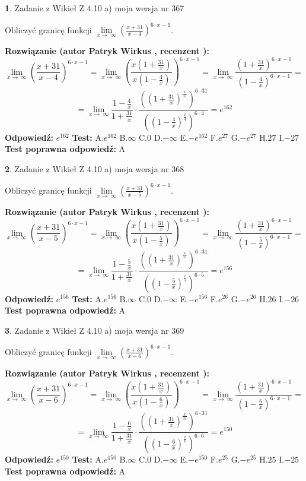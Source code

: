 \documentclass[12pt, a4paper]{article}
\theoremstyle{definition} %
\newtheorem{zad}{}
\newcommand{\zadStart}[1]{\begin{zad}#1\newline}
\newcommand{\zadStop}{\end{zad}}
\newcommand{\rozwStart}[2]{\noindent \textbf{Rozwiązanie (autor #1 , recenzent #2): }\newline}
\newcommand{\rozwStop}{\newline}
\newcommand{\odpStart}{\noindent \textbf{Odpowiedź:}\newline}
\newcommand{\odpStop}{\newline}
\newcommand{\testStart}{\noindent \textbf{Test:}\newline}
\newcommand{\testStop}{\newline}
\newcommand{\kluczStart}{\noindent \textbf{Test poprawna odpowiedź:}\newline}
\newcommand{\kluczStop}{\newline}
\begin{document}
\zadStart{Zadanie z Wikieł Z 4.10 a) moja wersja nr 367}

Obliczyć granicę funkcji  $\lim\limits_{x\to\ \infty}(\frac{x+31}{x-4})^{6\cdot x-1}$.
\zadStop
\rozwStart{Patryk Wirkus}{}
$$\lim\limits_{x\to\ \infty}(\frac{x+31}{x-4})^{6\cdot x-1} = \lim\limits_{x\to\ \infty}(\frac{x(1+\frac{31}{x})}{x(1-\frac{4}{x})})^{6\cdot x-1}=\lim\limits_{x\to\ \infty}\frac{(1+\frac{31}{x})^{6\cdot x-1}}{(1-\frac{4}{x})^{6\cdot x-1}}=$$
$$=\lim\limits_{x\to\ \infty}\frac{1-\frac{4}{x}}{1+\frac{31}{x}}\cdot\frac{((1+\frac{31}{x})^{\frac{x}{31}})^{6\cdot31}}{((1-\frac{4}{x})^{\frac{x}{4}})^{6\cdot4}}=e^{162}$$
\rozwStop
\odpStart
$e^{162}$
\odpStop
\testStart
A.$e^{162}$ B.$\infty$ C.$0$ D.$-\infty$ E.$-e^{162}$
F.$e^{27}$ G.$-e^{27}$
H.$27$
I.$-27$
\testStop
\kluczStart
A
\kluczStop



\zadStart{Zadanie z Wikieł Z 4.10 a) moja wersja nr 368}

Obliczyć granicę funkcji  $\lim\limits_{x\to\ \infty}(\frac{x+31}{x-5})^{6\cdot x-1}$.
\zadStop
\rozwStart{Patryk Wirkus}{}
$$\lim\limits_{x\to\ \infty}(\frac{x+31}{x-5})^{6\cdot x-1} = \lim\limits_{x\to\ \infty}(\frac{x(1+\frac{31}{x})}{x(1-\frac{5}{x})})^{6\cdot x-1}=\lim\limits_{x\to\ \infty}\frac{(1+\frac{31}{x})^{6\cdot x-1}}{(1-\frac{5}{x})^{6\cdot x-1}}=$$
$$=\lim\limits_{x\to\ \infty}\frac{1-\frac{5}{x}}{1+\frac{31}{x}}\cdot\frac{((1+\frac{31}{x})^{\frac{x}{31}})^{6\cdot31}}{((1-\frac{5}{x})^{\frac{x}{5}})^{6\cdot5}}=e^{156}$$
\rozwStop
\odpStart
$e^{156}$
\odpStop
\testStart
A.$e^{156}$ B.$\infty$ C.$0$ D.$-\infty$ E.$-e^{156}$
F.$e^{26}$ G.$-e^{26}$
H.$26$
I.$-26$
\testStop
\kluczStart
A
\kluczStop



\zadStart{Zadanie z Wikieł Z 4.10 a) moja wersja nr 369}

Obliczyć granicę funkcji  $\lim\limits_{x\to\ \infty}(\frac{x+31}{x-6})^{6\cdot x-1}$.
\zadStop
\rozwStart{Patryk Wirkus}{}
$$\lim\limits_{x\to\ \infty}(\frac{x+31}{x-6})^{6\cdot x-1} = \lim\limits_{x\to\ \infty}(\frac{x(1+\frac{31}{x})}{x(1-\frac{6}{x})})^{6\cdot x-1}=\lim\limits_{x\to\ \infty}\frac{(1+\frac{31}{x})^{6\cdot x-1}}{(1-\frac{6}{x})^{6\cdot x-1}}=$$
$$=\lim\limits_{x\to\ \infty}\frac{1-\frac{6}{x}}{1+\frac{31}{x}}\cdot\frac{((1+\frac{31}{x})^{\frac{x}{31}})^{6\cdot31}}{((1-\frac{6}{x})^{\frac{x}{6}})^{6\cdot6}}=e^{150}$$
\rozwStop
\odpStart
$e^{150}$
\odpStop
\testStart
A.$e^{150}$ B.$\infty$ C.$0$ D.$-\infty$ E.$-e^{150}$
F.$e^{25}$ G.$-e^{25}$
H.$25$
I.$-25$
\testStop
\kluczStart
A
\kluczStop
\end{document}
